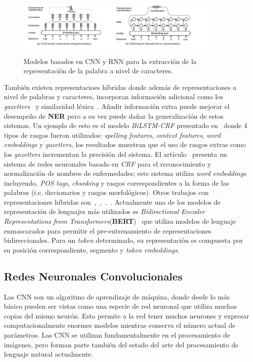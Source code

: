 \begin{figure}[h!]
	\centering
	\includegraphics[width = 10cm]{Imagenes/charEmb.png}
	\caption{Modelos basados en CNN y RNN para la extracci\'on de la representaci\'on de la palabra a nivel de caracteres.}\label{fig:charLevel}
\end{figure}

Tambi\'en existen representacioes h\'ibridas donde adem\'as de representaciones a nivel de palabras y caracteres, incorporan informaci\'on adicional como los \emph{gazetters}~\cite{huang2015bidirectional} y similaridad l\'exica~\cite{ghaddar2018robust}. A\~nadir informaci\'on extra puede mejorar el desempe\~no de \textbf{NER} pero a su vez puede da\~nar la generalizaci\'on de estos sistemas. Un ejemplo de esto es el modelo \emph{BiLSTM-CRF} presentado en~\cite{huang2015bidirectional} donde 4 tipos de rasgos fueron utilizados: \emph{spelling features}, \emph{context features}, \emph{word embeddings} y \emph{gazetters}, los resultados muestran que el uso de rasgos extras como los \emph{gazetters} incrementan la precisi\'on del sistema. El art\'iculo~\cite{wei2016disease} presenta un sistema de redes neuronales basado en \emph{CRF} para el reconocimiento y normalizaci\'on de nombres de enfermedades; este sistema utiliza \emph{word embeddings} incluyendo, \emph{POS tags}, \emph{chunking} y rasgos correspondientes a la forma de las palabras (i.e, diccionarios y rasgos morfol\'ogicos). Otros trabajos con representaciones h\'ibridas son~\cite{lin2017multi},~\cite{aguilar2019multi},~\cite{jansson2017distributed},~\cite{moon2018multimodal}. Actualmente uno de los modelos de representaci\'on de lenguajes m\'as utilizados es \emph{Bidirectional Encoder Representations from Transformers}(\textbf{BERT})~\cite{devlin2018bert} que utiliza modelos de lenguaje enmascarados para permitir el pre-entrenamiento de representaciones bidireccionales. Para un \emph{token} determinado, su representaci\'on es compuesta por su posici\'on correspondiente, segmento y \emph{token embeddings}.


\subsection{Redes Neuronales Convolucionales}
Las CNN son un algoritmo de aprendizaje de m\'aquina, donde desde lo m\'as b\'asico pueden ser vistas como una especie de red neuronal que utiliza muchas copias del mismo neur\'on. Esto permite a la red tener muchos neurones y expresar computacionalmente enormes modelos mientras conserva el n\'umero actual de par\'ametros. Las CNN se utilizan fundamentalmente en el procesamiento de im\'agenes, pero forman parte tambi\'en del estado del arte del procesamiento de lenguaje natural actualmente.

